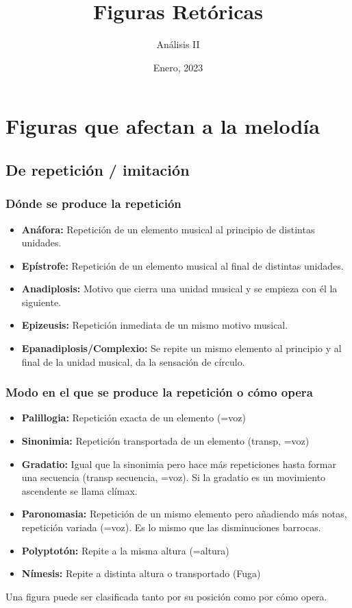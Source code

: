 \documentclass[11pt,a4paper]{article}
\title{Figuras Retóricas}
\author{Análisis II}
\date{Enero, 2023}
\begin{document}
	\maketitle
	\tableofcontents
	\section{Figuras que afectan a la melodía}
	\subsection{De repetición / imitación}
		 \subsubsection{Dónde se produce la repetición}
			\begin{itemize}
				\item \textbf{Anáfora:} Repetición de un elemento musical al principio de distintas unidades.
				\item \textbf{Epístrofe:} Repetición de un elemento musical al final de distintas unidades.
				\item \textbf{Anadiplosis:} Motivo que cierra una unidad musical y se empieza con él la siguiente.
				\item \textbf{Epizeusis:} Repetición inmediata de un mismo motivo musical.
				\item \textbf{Epanadiplosis/Complexio:} Se repite un mismo elemento al principio y al final de la unidad musical, da la sensación de círculo.
			\end{itemize}
		\subsubsection{Modo en el que se produce la repetición o cómo opera}
			\begin{itemize}
				\item \textbf{Palillogia:} Repetición exacta de un elemento (=voz)
				\item \textbf{Sinonimia:} Repetición transportada de un elemento (transp, =voz)
				\item \textbf{Gradatio:} Igual que la sinonimia pero hace más repeticiones hasta formar una secuencia (transp secuencia, =voz). Si la gradatio es un movimiento ascendente se llama clímax.
				\item \textbf{Paronomasia:} Repetición de un mismo elemento pero añadiendo más notas, repetición variada (=voz). Es lo mismo que las disminuciones barrocas.
				\item \textbf{Polyptotón:} Repite a la misma altura (=altura)
				\item \textbf{Nímesis:} Repite a distinta altura o transportado (Fuga)
			
			\end{itemize}
		Una figura puede ser clasificada tanto por su posición como por cómo opera.
\end{document}
